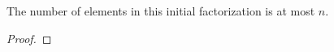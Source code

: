 \begin{sublemma}
\label{initial-factorization-card}
\leanok
The number of elements in this initial factorization is at most $n$.
\end{sublemma}
\begin{proof}
\leanok
\end{proof}
